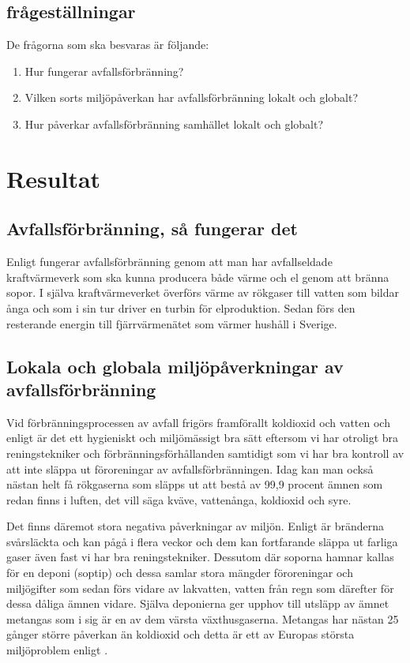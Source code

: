 \documentclass[11p]{article}
\begin{document}
    \subsection{frågeställningar}
    De frågorna som ska besvaras är följande:
    \begin{enumerate}
        \item Hur fungerar avfallsförbränning?
        \item Vilken sorts miljöpåverkan har avfallsförbränning lokalt och globalt?
        \item Hur påverkar avfallsförbränning samhället lokalt och globalt?
    \end{enumerate}

    \section{Resultat}
    \subsection{Avfallsförbränning, så fungerar det}
    Enligt \textcite{SoporNu} fungerar avfallsförbränning genom att man har avfallseldade kraftvärmeverk som ska kunna producera både värme och el genom att bränna sopor. I själva kraftvärmeverket överförs värme av rökgaser till vatten som bildar ånga och som i sin tur driver en turbin för elproduktion. Sedan förs den resterande energin till fjärrvärmenätet som värmer hushåll i Sverige.
    \subsection{Lokala och globala miljöpåverkningar av avfallsförbränning}
    Vid förbränningsprocessen av avfall frigörs framförallt koldioxid och vatten och enligt \textcite{AvfallSverige} är det ett hygieniskt och miljömässigt bra sätt eftersom vi har otroligt bra reningstekniker och förbränningsförhållanden samtidigt som vi har bra kontroll av att inte släppa ut föroreningar av avfallsförbränningen. Idag kan man också nästan helt få rökgaserna som släpps ut att bestå av 99,9 procent ämnen som redan finns i luften, det vill säga kväve, vattenånga, koldioxid och syre.

    \newline

    Det finns däremot stora negativa påverkningar av miljön. Enligt \textcite{naturvardsverket} är bränderna svårsläckta och kan pågå i flera veckor och dem kan fortfarande släppa ut farliga gaser även fast vi har bra reningstekniker. Dessutom där soporna hamnar kallas för en deponi (soptip) och dessa samlar stora mängder föroreningar och miljögifter som sedan förs vidare av lakvatten, vatten från regn som därefter för dessa dåliga ämnen vidare. Själva deponierna ger upphov till utsläpp av ämnet metangas som i sig är en av dem värsta växthusgaserna. Metangas har nästan 25 gånger större påverkan än koldioxid och detta är ett av Europas största miljöproblem enligt \textcite{Vattenfall}.
\end{document}

